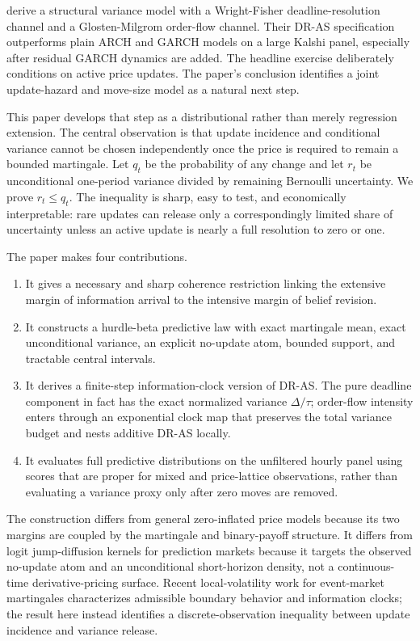 \documentclass[11pt]{article}
\newcommand{\1}{\mathbb I}
\begin{document}
\citet{xi2026volatility} derive a structural variance model with a
Wright-Fisher deadline-resolution channel and a Glosten-Milgrom order-flow
channel. Their DR-AS specification outperforms plain ARCH and GARCH models on a
large Kalshi panel, especially after residual GARCH dynamics are added. The
headline exercise deliberately conditions on active price updates. The paper's
conclusion identifies a joint update-hazard and move-size model as a natural
next step.

This paper develops that step as a distributional rather than merely
regression extension. The central observation is that update incidence and
conditional variance cannot be chosen independently once the price is required
to remain a bounded martingale. Let $q_t$ be the probability of any change and
let $r_t$ be unconditional one-period variance divided by remaining Bernoulli
uncertainty. We prove $r_t\le q_t$. The inequality is sharp, easy to test, and
economically interpretable: rare updates can release only a correspondingly
limited share of uncertainty unless an active update is nearly a full
resolution to zero or one.

The paper makes four contributions.

\begin{enumerate}[leftmargin=*]
\item It gives a necessary and sharp coherence restriction linking the
extensive margin of information arrival to the intensive margin of belief
revision.
\item It constructs a hurdle-beta predictive law with exact martingale mean,
exact unconditional variance, an explicit no-update atom, bounded support, and
tractable central intervals.
\item It derives a finite-step information-clock version of DR-AS. The pure
deadline component in fact has the exact normalized variance $\Delta/\tau$;
order-flow intensity enters through an exponential clock map that preserves the
total variance budget and nests additive DR-AS locally.
\item It evaluates full predictive distributions on the unfiltered hourly
panel using scores that are proper for mixed and price-lattice observations,
rather than evaluating a variance proxy only after zero moves are removed.
\end{enumerate}

The construction differs from general zero-inflated price models
\citep{catania2019dynamic,holy2023intraday} because its two margins are coupled
by the martingale and binary-payoff structure. It differs from logit
jump-diffusion kernels for prediction markets \citep{dalen2025toward} because it
targets the observed no-update atom and an unconditional short-horizon density,
not a continuous-time derivative-pricing surface. Recent local-volatility work
for event-market martingales \citep{xu2026local} characterizes admissible
boundary behavior and information clocks; the result here instead identifies a
discrete-observation inequality between update incidence and variance release.
\end{document}
